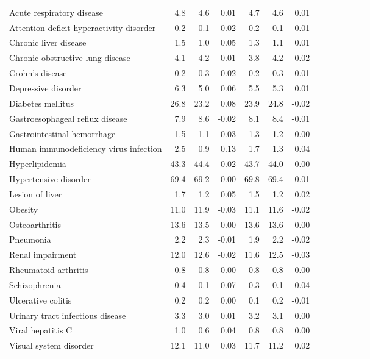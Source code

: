 \documentclass[11pt,]{article}
\begin{document}
\begin{longtable}{lrrrrrrrrrrrr}
      Acute respiratory disease &  4.8 &  4.6 &  0.01 &  4.7 &  4.6 &  0.01 \\ 
      Attention deficit hyperactivity disorder &  0.2 &  0.1 &  0.02 &  0.2 &  0.1 &  0.01 \\ 
      Chronic liver disease &  1.5 &  1.0 &  0.05 &  1.3 &  1.1 &  0.01 \\ 
      Chronic obstructive lung disease &  4.1 &  4.2 & -0.01 &  3.8 &  4.2 & -0.02 \\ 
      Crohn's disease &  0.2 &  0.3 & -0.02 &  0.2 &  0.3 & -0.01 \\ 
      Depressive disorder &  6.3 &  5.0 &  0.06 &  5.5 &  5.3 &  0.01 \\ 
      Diabetes mellitus & 26.8 & 23.2 &  0.08 & 23.9 & 24.8 & -0.02 \\ 
      Gastroesophageal reflux disease &  7.9 &  8.6 & -0.02 &  8.1 &  8.4 & -0.01 \\ 
      Gastrointestinal hemorrhage &  1.5 &  1.1 &  0.03 &  1.3 &  1.2 &  0.00 \\ 
      Human immunodeficiency virus infection &  2.5 &  0.9 &  0.13 &  1.7 &  1.3 &  0.04 \\ 
      Hyperlipidemia & 43.3 & 44.4 & -0.02 & 43.7 & 44.0 &  0.00 \\ 
      Hypertensive disorder & 69.4 & 69.2 &  0.00 & 69.8 & 69.4 &  0.01 \\ 
      Lesion of liver &  1.7 &  1.2 &  0.05 &  1.5 &  1.2 &  0.02 \\ 
      Obesity & 11.0 & 11.9 & -0.03 & 11.1 & 11.6 & -0.02 \\ 
      Osteoarthritis & 13.6 & 13.5 &  0.00 & 13.6 & 13.6 &  0.00 \\ 
      Pneumonia &  2.2 &  2.3 & -0.01 &  1.9 &  2.2 & -0.02 \\ 
      Renal impairment & 12.0 & 12.6 & -0.02 & 11.6 & 12.5 & -0.03 \\ 
      Rheumatoid arthritis &  0.8 &  0.8 &  0.00 &  0.8 &  0.8 &  0.00 \\ 
      Schizophrenia &  0.4 &  0.1 &  0.07 &  0.3 &  0.1 &  0.04 \\ 
      Ulcerative colitis &  0.2 &  0.2 &  0.00 &  0.1 &  0.2 & -0.01 \\ 
      Urinary tract infectious disease &  3.3 &  3.0 &  0.01 &  3.2 &  3.1 &  0.00 \\ 
      Viral hepatitis C &  1.0 &  0.6 &  0.04 &  0.8 &  0.8 &  0.00 \\ 
      Visual system disorder & 12.1 & 11.0 &  0.03 & 11.7 & 11.2 &  0.02 \\ 

\end{longtable}
\end{document}
